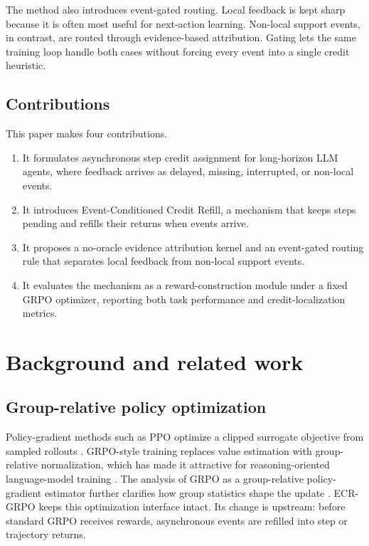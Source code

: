 \documentclass[letterpaper]{article} %
\begin{document}
The method also introduces event-gated routing. Local feedback is kept sharp because it is often most useful for next-action learning. Non-local support events, in contrast, are routed through evidence-based attribution. Gating lets the same training loop handle both cases without forcing every event into a single credit heuristic.

\subsection{Contributions}

This paper makes four contributions.

\begin{enumerate}
\item It formulates asynchronous step credit assignment for long-horizon LLM agents, where feedback arrives as delayed, missing, interrupted, or non-local events.
\item It introduces Event-Conditioned Credit Refill, a mechanism that keeps steps pending and refills their returns when events arrive.
\item It proposes a no-oracle evidence attribution kernel and an event-gated routing rule that separates local feedback from non-local support events.
\item It evaluates the mechanism as a reward-construction module under a fixed GRPO optimizer, reporting both task performance and credit-localization metrics.
\end{enumerate}
\section{Background and related work}

\subsection{Group-relative policy optimization}

Policy-gradient methods such as PPO optimize a clipped surrogate objective from sampled rollouts \citep{schulman2017ppo}. GRPO-style training replaces value estimation with group-relative normalization, which has made it attractive for reasoning-oriented language-model training \citep{shao2024deepseekmath,deepseekai2025deepseekr1}. The analysis of GRPO as a group-relative policy-gradient estimator further clarifies how group statistics shape the update \citep{zhou2026demystifyinggrpo}. ECR-GRPO keeps this optimization interface intact. Its change is upstream: before standard GRPO receives rewards, asynchronous events are refilled into step or trajectory returns.
\end{document}
